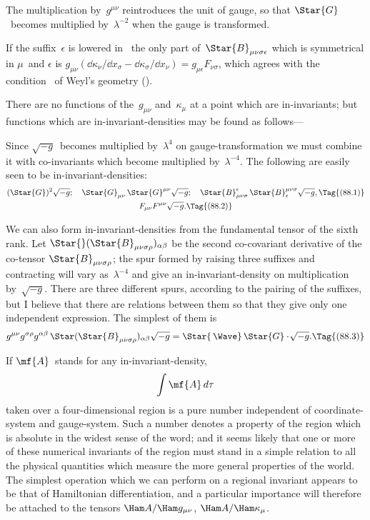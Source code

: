\documentclass[12pt]{book}
\begin{document}
The multiplication by~$g^{\mu\nu}$ reintroduces the unit of gauge, so that $\Star{G}$~becomes
multiplied by~$\lambda^{-2}$ when the gauge is transformed.

If the suffix~$\epsilon$ is lowered in~ the only part of~$\Star{B}_{\mu\nu\sigma\epsilon}$ which is symmetrical
in $\mu$~and $\epsilon$ is $g_{\mu\nu} (\dd\kappa_{\nu}/\dd x_{\sigma} - \dd\kappa_{\sigma}/\dd x_{\nu}) = g_{\mu\epsilon} F_{\nu\sigma}$, which agrees with the
condition~ of Weyl's geometry ().

%

There are no functions of the~$g_{\mu\nu}$ and~$\kappa_{\mu}$ at a point which are in\hyp{}invariants;
but functions which are in\hyp{}invariant\hyp{}densities may be found as
follows---

Since $\sqrt{-g}$~becomes multiplied by~$\lambda^{4}$ on gauge\hyp{}transformation we must
combine it with co\hyp{}invariants which become multiplied by~$\lambda^{-4}$. The following
are easily seen to be in\hyp{}invariant\hyp{}densities:
\begin{gather*}
  (\Star{G})^{2} \sqrt{-g};\quad
  \Star{G}_{\mu\nu}\, \Star{G}^{\mu\nu} \sqrt{-g};\quad
  \Star{B}_{\mu\nu\sigma}^{\epsilon}\, \Star{B}_{\epsilon}^{\mu\nu\sigma} \sqrt{-g},
  \Tag{(88.1)} \\
  F_{\mu\nu} F^{\mu\nu} \sqrt{-g}.
  \Tag{(88.2)}
\end{gather*}

We can also form in\hyp{}invariant\hyp{}densities from the fundamental tensor of
the sixth rank. Let $\Star{}(\Star{B}_{\mu\nu\sigma\rho})_{\alpha\beta}$ be the second co\hyp{}covariant derivative of the
co\hyp{}tensor $\Star{B}_{\mu\nu\sigma\rho}$; the spur formed by raising three suffixes and contracting
will vary as~$\lambda^{-4}$ and give an in\hyp{}invariant\hyp{}density on multiplication by~$\sqrt{-g}$.
%
There are three different spurs, according to the pairing of the suffixes, but
I believe that there are relations between them so that they give only one
independent expression. The simplest of them is
\[
g^{\mu\nu} g^{\sigma\rho} g^{\alpha\beta}\, \Star(\Star{B}_{\mu\nu\sigma\rho})_{\alpha\beta} \sqrt{-g}
= \Star{\,\Wave}\, \Star{G} \cdot \!\sqrt{-g}.
\Tag{(88.3)}
\]

If $\mf{A}$~stands for any in\hyp{}invariant\hyp{}density,
%
\[
\int \mf{A}\, d\tau
\]
taken over a four\hyp{}dimensional region is a pure number independent of coordinate\hyp{}system
and gauge\hyp{}system. Such a number denotes a property of
the region which is absolute in the widest sense of the word; and it seems
likely that one or more of these numerical invariants of the region must
stand in a simple relation to all the physical quantities which measure the
more general properties of the world. The simplest operation which we can
perform on a regional invariant appears to be that of Hamiltonian differentiation,
and a particular importance will therefore be attached to the tensors
$\Ham A/\Ham g_{\mu\nu}$, $\Ham A/\Ham\kappa_{\mu}$.
\end{document}
